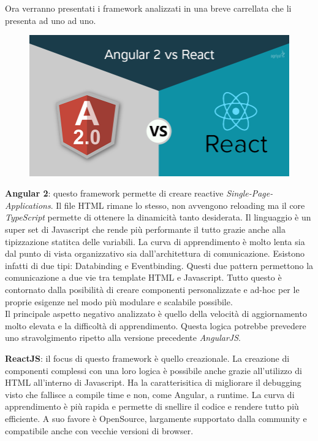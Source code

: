 \documentclass[a4paper]{article}
\begin{document}
\par Ora verranno presentati i framework analizzati in una breve carrellata che li
presenta ad uno ad uno.
\begin{figure}[H]
	\includegraphics[width=\textwidth]{frameworks.png}
	\centering
\end{figure}
\par \textbf{Angular 2}: questo framework permette di creare reactive \emph{Single-Page-Applications}.
Il file HTML rimane lo stesso, non avvengono reloading ma il core \emph{TypeScript} permette di 
ottenere la dinamicità tanto desiderata. Il linguaggio è un super set di Javascript che rende più
performante il tutto grazie anche alla tipizzazione statitca delle variabili. La curva di 
apprendimento è molto lenta sia dal punto di vista organizzativo sia dall'architettura di 
comunicazione. Esistono infatti di due tipi: Databinding e Eventbinding. Questi due pattern
permettono la comunicazione a due vie tra template HTML e Javascript. Tutto questo è
contornato dalla posibilità di creare componenti personalizzate e ad-hoc per le proprie esigenze
nel modo più modulare e scalabile possibile.\\ 
Il principale aspetto negativo analizzato è quello della velocità di aggiornamento molto elevata
e la difficoltà di apprendimento. Questa logica potrebbe prevedere uno stravolgimento ripetto 
alla versione precedente \emph{AngularJS}.
\par \textbf{ReactJS}: il focus di questo framework è quello creazionale. La creazione di componenti
complessi con una loro logica è possibile anche grazie all'utilizzo di HTML all'interno di Javascript.
Ha la caratterisitica di migliorare il debugging visto che fallisce a compile time e non, come Angular,
a runtime. La curva di apprendimento è più rapida e permette di snellire il codice e rendere tutto più
efficiente. A suo favore è OpenSource, largamente supportato dalla community e compatibile anche con 
vecchie versioni di browser.
\end{document}
